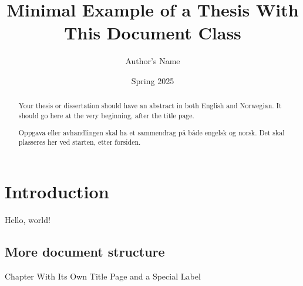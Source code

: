 \documentclass[norsk,USenglish,master]{thesis}
\title{Minimal Example of a Thesis With This Document Class}
\author{Author's Name}
\date{Spring 2025}
\begin{document}
\maketitle

\frontmatter

\begin{abstract}

Your thesis or dissertation should have an abstract in both English and Norwegian. It should go here at the very beginning, after the title page.

\end{abstract}

\begin{otherlanguage}{norsk}
\begin{abstract}

Oppgava eller avhandlingen skal ha et sammendrag på både engelsk og norsk. Det skal plasseres her ved starten, etter forsiden.

\end{abstract}
\end{otherlanguage}

\tableofcontents

\mainmatter

\chapter{Introduction}

Hello, world! \lipsum[1]

\section{More document structure}

\lipsum[2-9]

\begin{dividerpage}[uitbluelight]
    {Chapter With Its Own Title Page and a Special Label} %
\end{dividerpage}

\lipsum[10-15]
\end{document}
